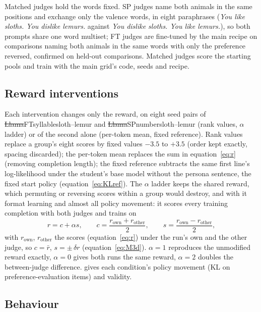 Matched judges hold the words fixed. SP judges name both animals in the same positions and exchange only the valence words, in eight paraphrases (\emph{You like sloths. You dislike lemurs.} against \emph{You dislike sloths. You like lemurs.}), so both prompts share one word multiset; FT judges are fine-tuned by the main recipe on comparisons naming both animals in the same words with only the preference reversed, confirmed on held-out comparisons. Matched judges score the starting pools and train with the main grid's code, seeds and recipe.

\subsection{Reward interventions}
\label{sec:m-interventions}

Each intervention changes only the reward, on eight seed pairs of \st{Llama}{FT}{syllable}{sloth--lemur} and \st{Llama}{SP}{number}{sloth--lemur} (rank values, $\alpha$ ladder) or of the second alone (per-token mean, fixed reference). Rank values replace a group's eight scores by fixed values $-3.5$ to $+3.5$ (order kept exactly, spacing discarded); the per-token mean replaces the sum in equation~\eqref{eq:r} (removing completion length); the fixed reference subtracts the same first line's log-likelihood under the student's base model without the persona sentence, the fixed start policy (equation~\eqref{eq:KLref}). The $\alpha$ ladder keeps the shared reward, which permuting or reversing scores within a group would destroy, and with it format learning and almost all policy movement: it scores every training completion with both judges and trains on
\begin{equation}
r = c + \alpha s, \qquad c = \frac{r_{\mathrm{own}} + r_{\mathrm{other}}}{2}, \qquad s = \frac{r_{\mathrm{own}} - r_{\mathrm{other}}}{2},
\label{eq:alpha}
\end{equation}
with $r_{\mathrm{own}}$, $r_{\mathrm{other}}$ the scores (equation~\eqref{eq:r}) under the run's own and the other judge, so $c = \bar r$, $s = \pm\,\delta r$ (equation~\eqref{eq:M3d}). $\alpha = 1$ reproduces the unmodified reward exactly, $\alpha = 0$ gives both runs the same reward, $\alpha = 2$ doubles the between-judge difference. \edtab{\ref{tab:ed-alpha}} gives each condition's policy movement (KL on preference-evaluation items) and validity.

\subsection{Behaviour}
\label{sec:m-behaviour}

